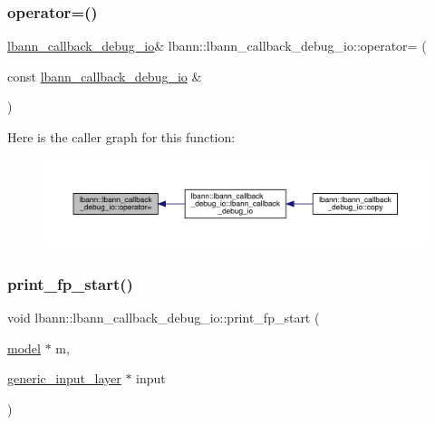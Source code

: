 \mbox{\label{classlbann_1_1lbann__callback__debug__io_ae424948cc2809272c1cd755b8e2f0c3d}} 
\subsubsection{\texorpdfstring{operator=()}{operator=()}}
{\footnotesize\ttfamily \hyperlink{classlbann_1_1lbann__callback__debug__io}{lbann\+\_\+callback\+\_\+debug\+\_\+io}\& lbann\+::lbann\+\_\+callback\+\_\+debug\+\_\+io\+::operator= (\begin{DoxyParamCaption}\item[{const \hyperlink{classlbann_1_1lbann__callback__debug__io}{lbann\+\_\+callback\+\_\+debug\+\_\+io} \&}]{ }\end{DoxyParamCaption})\hspace{0.3cm}{\ttfamily [default]}}

Here is the caller graph for this function\+:\nopagebreak
\begin{figure}[H]
\begin{center}
\leavevmode
\includegraphics[width=350pt]{classlbann_1_1lbann__callback__debug__io_ae424948cc2809272c1cd755b8e2f0c3d_icgraph}
\end{center}
\end{figure}
\mbox{\label{classlbann_1_1lbann__callback__debug__io_a3c9897a583441381f82a11246aea4424}} 
\subsubsection{\texorpdfstring{print\+\_\+fp\+\_\+start()}{print\_fp\_start()}}
{\footnotesize\ttfamily void lbann\+::lbann\+\_\+callback\+\_\+debug\+\_\+io\+::print\+\_\+fp\+\_\+start (\begin{DoxyParamCaption}\item[{\hyperlink{classlbann_1_1model}{model} $\ast$}]{m,  }\item[{\hyperlink{classlbann_1_1generic__input__layer}{generic\+\_\+input\+\_\+layer} $\ast$}]{input }\end{DoxyParamCaption})}

